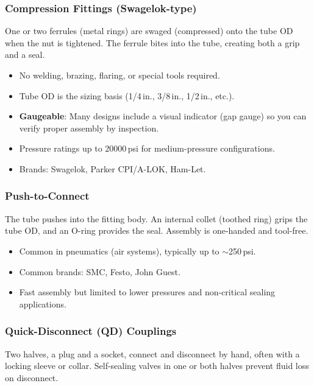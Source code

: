 \subsubsection{Compression Fittings (Swagelok-type)}

One or two ferrules (metal rings) are swaged (compressed) onto the tube OD when the nut is tightened. The ferrule bites into the tube, creating both a grip and a seal.

\begin{itemize}[nosep,leftmargin=1.5em]
  \item No welding, brazing, flaring, or special tools required.
  \item Tube OD is the sizing basis (1/4\,in., 3/8\,in., 1/2\,in., etc.).
  \item \textbf{Gaugeable}: Many designs include a visual indicator (gap gauge) so you can verify proper assembly by inspection.
  \item Pressure ratings up to 20000\,psi for medium-pressure configurations.
  \item Brands: Swagelok, Parker CPI/A-LOK, Ham-Let.
\end{itemize}

\subsubsection{Push-to-Connect}

The tube pushes into the fitting body. An internal collet (toothed ring) grips the tube OD, and an O-ring provides the seal. Assembly is one-handed and tool-free.

\begin{itemize}[nosep,leftmargin=1.5em]
  \item Common in pneumatics (air systems), typically up to $\sim$250\,psi.
  \item Common brands: SMC, Festo, John Guest.
  \item Fast assembly but limited to lower pressures and non-critical sealing applications.
\end{itemize}

\subsubsection{Quick-Disconnect (QD) Couplings}

Two halves, a plug and a socket, connect and disconnect by hand, often with a locking sleeve or collar. Self-sealing valves in one or both halves prevent fluid loss on disconnect.

